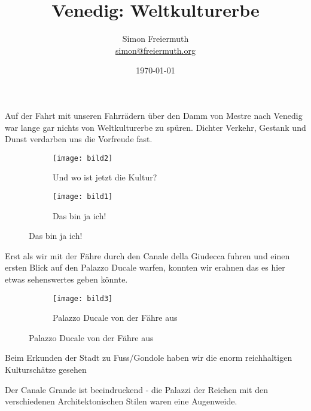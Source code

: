 \documentclass[12pt, letterpaper, twoside]{article}
\title{Venedig: Weltkulturerbe}
\author{Simon Freiermuth \\ \href{mailto:simon@freiermuth.org}{simon@freiermuth.org}}
\date{\today}
\begin{document}
\maketitle

\begin{flushleft}


\section{}
Auf der Fahrt mit unseren Fahrrädern über den Damm von Mestre nach Venedig war
lange gar nichts von Weltkulturerbe zu spüren. Dichter Verkehr, Gestank und Dunst
verdarben uns die Vorfreude fast.


\begin{figure}[h]

\begin{subfigure}{0.5\textwidth}
\hspace{0,5cm}\texttt{[image: bild2]}
\caption{Und wo ist jetzt die Kultur?}
\end{subfigure}
\begin{subfigure}{0.5\textwidth}
\hspace{1,5cm}\texttt{[image: bild1]}
\caption{Das bin ja ich!}
\end{subfigure}

\end{figure}

\pagebreak

Erst als wir mit der Fähre durch den Canale della Giudecca fuhren und einen ersten Blick
auf den Palazzo Ducale warfen, konnten wir erahnen das es hier etwas sehenswertes geben
könnte.

\begin{figure}[h]

\begin{subfigure}{0.5\textwidth}
\hspace{1,5cm}\texttt{[image: bild3]}
\caption{Palazzo Ducale von der Fähre aus}
\end{subfigure}
\end{figure}

\hfill

Beim Erkunden der Stadt zu Fuss/Gondole haben wir die enorm reichhaltigen Kulturschätze
gesehen

Der Canale Grande ist beeindruckend - die Palazzi der Reichen mit den verschiedenen
Architektonischen Stilen waren eine Augenweide.


\end{flushleft}
\end{document}
